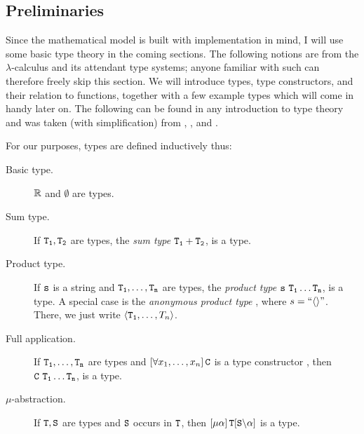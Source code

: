 \subsection{Preliminaries}\label{sec:mathematicalPreliminaries}

Since the mathematical model is built with implementation in mind, I will use some basic type theory in the coming sections. The following notions are from the $\lambda$-calculus and its attendant type systems; anyone familiar with such can therefore freely skip this section. We will introduce types, type constructors, and their relation to functions, together with a few example types which will come in handy later on. The following can be found in any introduction to type theory and was taken (with simplification) from \cite{Mendler:1988:IDT:913822}, \cite{typeIntroduction2}, and \cite{Jacobs97atutorial}.

\begin{definition}\label{def:type}
	For our purposes, types are defined inductively thus:
	\begin{description}
		\item[Basic type.] $\mathbb{R}$ and $\emptyset$ are types.
		\item[Sum type.] If $\mathtt{T_1},\mathtt{T_2}$ are types, the {\em sum type} $\mathtt{T_1 + T_2}$, is a type. 
		\item[Product type.] If $\mathtt{s}$ is a string and $\mathtt{T_1},\dots,\mathtt{T_n}$ are types, the {\em product type} $\type{s}\ \type{T_1} \dots \type{T_n}$, is a type. A special case is the {\em anonymous product type} , where $s=``\langle\rangle"$. There, we just write $\langle\mathtt{T_1},\dots,T_n \rangle$.
		\item[Full application.] If $\mathtt{T_1},\dots,\mathtt{T_n}$ are types and $\left[\forall x_1,\dots,x_n \right] \mathtt{C}$ is a type constructor , then $\mathtt{C\ T_1} \dots \mathtt{T_n}$, is a type.
		\item[$\mu$-abstraction.] If $\mathtt{T}, \mathtt{S}$ are types and $\mathtt{S}$ occurs in $\mathtt{T}$, then $\left[\mu \alpha \right]\mathtt{T}[\mathtt{S}\backslash\alpha]$  is a type.
	\end{description}
\end{definition}

